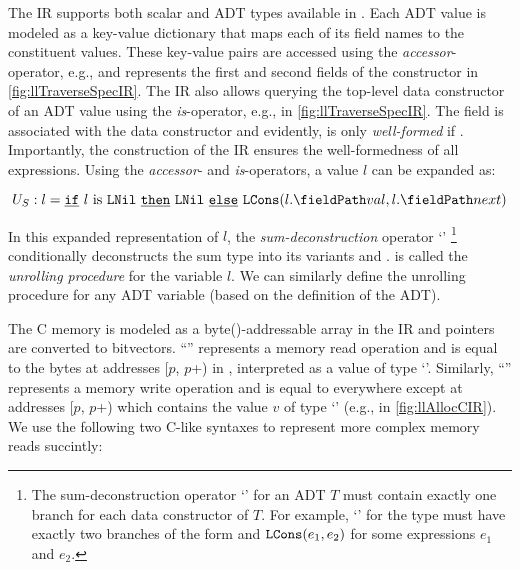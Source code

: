 The IR supports both scalar and ADT types available in \SpecL{}.
Each ADT value is modeled as a key-value dictionary that maps
each of its field names to the constituent values.
These key-value pairs are accessed using the {\em accessor}-operator,
e.g.,  and  represents the first and second
fields of the  constructor in \cref{fig:llTraverseSpecIR}.
The IR also allows querying the top-level data constructor of an ADT value
using the {\em is}-operator, e.g.,  in \cref{fig:llTraverseSpecIR}.
The  field is associated with the  data constructor
and evidently,  is only {\em well-formed} if .
Importantly, the construction of the \SpecL{} IR ensures the well-formedness of all expressions.
Using the {\em accessor}- and {\em is}-operators, a  value $l$ can be expanded as:

\begin{equation}
\label{eqn:specDeconstruct}
U_S: l = \sumIf{\sumIs{l}{LNil}} \  \sumThen{\cons{LNil}} \  \sumElse{\cons{LCons}(\prodAccess{l}{val}, \prodAccess{l}{next})}
\end{equation}

In this expanded representation of $l$,
the {\em sum-deconstruction} operator `\sumDtor{}'
\footnote{The sum-deconstruction operator `\sumDtor{}' for an ADT
$T$ must contain exactly one branch for each data constructor of $T$.
For example, `\sumDtor{}' for the  type must have exactly two branches
of the form  and ${\tt LCons}(e_1,e_2)$ for some expressions $e_1$ and $e_2$.}
conditionally deconstructs the sum type into its variants  and .
 is called the {\em unrolling procedure} for the  variable $l$.
We can similarly define the unrolling procedure for any ADT variable (based on the definition of the ADT).

The C memory is modeled as a byte()-addressable array \mem{} in the IR
and pointers are converted to bitvectors.
``'' represents a memory read operation and is equal to the bytes
at addresses [$p$, $p$+) in \mem{}, interpreted as a value of type `'.
Similarly, ``'' represents a memory write operation and is equal to \mem{}
everywhere except at addresses [$p$, $p$+) which contains
the value $v$ of type `' (e.g.,  in \cref{fig:llAllocCIR}).
We use the following two C-like syntaxes to represent more complex memory reads succintly:

